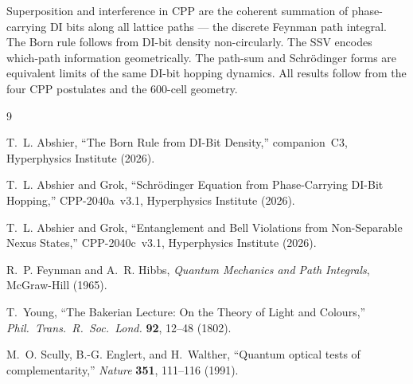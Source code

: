 \documentclass[11pt,a4paper]{article}
\begin{document}
Superposition and interference in CPP are the coherent summation of
phase-carrying DI bits along all lattice paths --- the discrete
Feynman path integral.  The Born rule follows from DI-bit density
non-circularly.  The SSV encodes which-path information geometrically.
The path-sum and Schr\"{o}dinger forms are equivalent limits of the
same DI-bit hopping dynamics.  All results follow from the four CPP
postulates and the 600-cell geometry.


\begin{thebibliography}{9}

T.~L. Abshier, ``The Born Rule from DI-Bit Density,''
companion~C3, Hyperphysics Institute (2026).

T.~L. Abshier and Grok,
``Schr\"{o}dinger Equation from Phase-Carrying DI-Bit Hopping,''
CPP-2040a~v3.1, Hyperphysics Institute (2026).

T.~L. Abshier and Grok,
``Entanglement and Bell Violations from Non-Separable Nexus States,''
CPP-2040c~v3.1, Hyperphysics Institute (2026).

R.~P. Feynman and A.~R. Hibbs,
\textit{Quantum Mechanics and Path Integrals}, McGraw-Hill (1965).

T.~Young, ``The Bakerian Lecture: On the Theory of Light and Colours,''
\textit{Phil.\ Trans.\ R.\ Soc.\ Lond.} \textbf{92}, 12--48 (1802).

M.~O. Scully, B.-G. Englert, and H.~Walther,
``Quantum optical tests of complementarity,''
\textit{Nature} \textbf{351}, 111--116 (1991).

\end{thebibliography}
\end{document}
